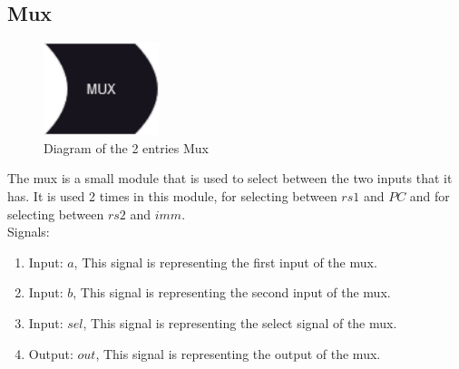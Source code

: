 \subsection{Mux}

\begin{figure}[H]
\centering
\includegraphics[width=0.30\textwidth]{../diagrams/decode/mux.png}
\caption{Diagram of the 2 entries Mux}
\label{fig:mux2}
\end{figure}

The mux is a small module that is used to select between the two inputs that it has. It is used 2 times in this module, for selecting between
$rs1$ and $PC$ and for selecting between $rs2$ and $imm$. \\

Signals:
\begin{enumerate}[label={\textbullet}]
    \item Input: $a$, This signal is representing the first input of the mux.
    \item Input: $b$, This signal is representing the second input of the mux.
    \item Input: $sel$, This signal is representing the select signal of the mux.
    \item Output: $out$, This signal is representing the output of the mux.
\end{enumerate}